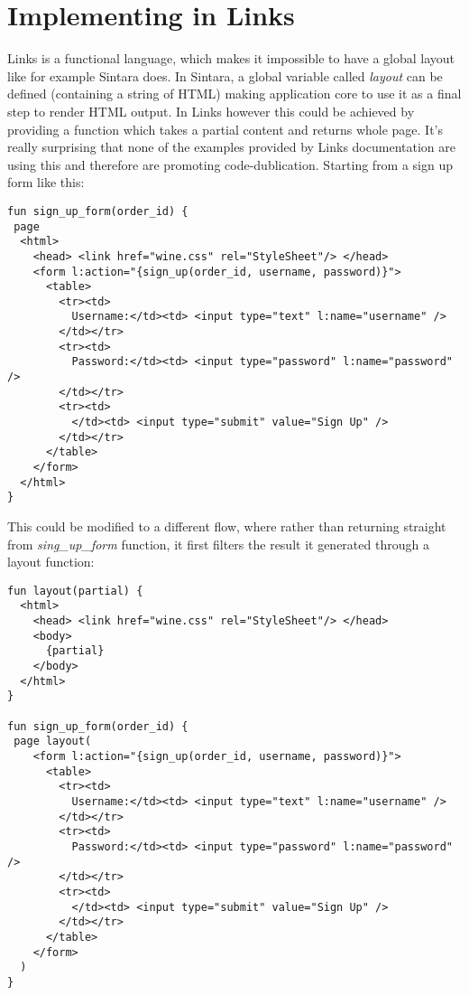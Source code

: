 \section{Implementing in Links}

Links is a functional language, which makes it impossible to have a global layout like for example Sintara does. In Sintara, a global variable called \textit{layout} can be defined (containing a string of HTML) making application core to use it as a final step to render HTML output. In Links however this could be achieved by providing a function which takes a partial content and returns whole page. It's really surprising that none of the examples provided by Links documentation are using this and therefore are promoting code-dublication. Starting from a sign up form like this:

\begin{codelisting}
\begin{verbatim}
fun sign_up_form(order_id) {
 page
  <html> 
    <head> <link href="wine.css" rel="StyleSheet"/> </head>
    <form l:action="{sign_up(order_id, username, password)}">
      <table>
        <tr><td>
          Username:</td><td> <input type="text" l:name="username" />
        </td></tr>
        <tr><td>
          Password:</td><td> <input type="password" l:name="password" />
        </td></tr>
        <tr><td>
          </td><td> <input type="submit" value="Sign Up" />
        </td></tr>
      </table>
    </form>
  </html>
}
\end{verbatim}
\end{codelisting}

This could be modified to a different flow, where rather than returning straight from \textit{sing\_up\_form} function, it first filters the result it generated through a layout function:

\begin{codelisting}
\begin{verbatim}
fun layout(partial) {
  <html> 
    <head> <link href="wine.css" rel="StyleSheet"/> </head>
    <body>
      {partial}
    </body>
  </html> 	
}

fun sign_up_form(order_id) {
 page layout(
    <form l:action="{sign_up(order_id, username, password)}">
      <table>
        <tr><td>
          Username:</td><td> <input type="text" l:name="username" />
        </td></tr>
        <tr><td>
          Password:</td><td> <input type="password" l:name="password" />
        </td></tr>
        <tr><td>
          </td><td> <input type="submit" value="Sign Up" />
        </td></tr>
      </table>
    </form>
  )
}
\end{verbatim}
\end{codelisting}

